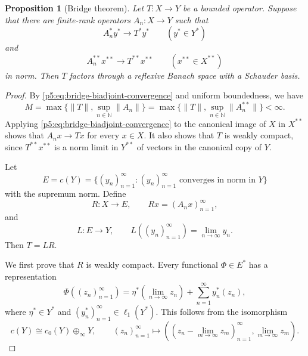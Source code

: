 \documentclass[11pt,reqno]{amsart}
\makeatletter
\theoremstyle{plain}
\newtheorem{proposition}[proposition]{Proposition}
\theoremstyle{definition}
\newcounter{problempaper}
\newenvironment{problempaperbody}{%
  \setcounter{subsection}{0}%
  \setcounter{subsubsection}{0}%
  \setcounter{paragraph}{0}%
  \renewcommand{\thesubsection}{\arabic{subsection}}%
  \renewcommand{\thesubsubsection}{\thesubsection.\arabic{subsubsection}}%
  \renewcommand{\theparagraph}{\thesubsubsection.\arabic{paragraph}}%
  \let\problem@outersection\section
  \let\problem@outersubsection\subsection
  \let\problem@outersubsubsection\subsubsection
  \let\problem@outerparagraph\paragraph
  \let\section\problem@papersection
  \let\subsection\problem@papersubsection
  \let\subsubsection\problem@papersubsubsection
}{%
  \let\section\problem@outersection
  \let\subsection\problem@outersubsection
  \let\subsubsection\problem@outersubsubsection
  \let\paragraph\problem@outerparagraph
}
\newcommand{\problem@target}[2]{%
  \hypertarget{problem-\theproblempaper-#1-#2}{}%
}
\newcommand{\problem@paperheading}[3]{%
  \par\bigskip
  \problem@target{#1}{#2}%
  \noindent{\large\bfseries #2.\quad #3\par}%
  \nobreak\smallskip
}
\newcommand{\problem@papersubheading}[3]{%
  \par\medskip
  \problem@target{#1}{#2}%
  \noindent{\normalsize\bfseries #2.\quad #3\par}%
  \nobreak\smallskip
}
\newcommand{\problem@papersubsubheading}[3]{%
  \par\smallskip
  \problem@target{#1}{#2}%
  \noindent{\normalsize\itshape #2.\quad #3.\ }%
}
\def\problem@papersection{%
  \@ifstar{\problem@papersectionstar}{\problem@papersectionnostar}%
}
\def\problem@papersectionstar#1{%
  \par\bigskip\noindent{\large\bfseries #1\par}\nobreak\smallskip
}
\def\problem@papersectionnostar#1{%
  \refstepcounter{subsection}%
  \setcounter{subsubsection}{0}%
  \setcounter{paragraph}{0}%
  \problem@paperheading{section}{\thesubsection}{#1}%
  \problem@writecontentsline{section}{\thesubsection}{#1}%
}
\def\problem@papersubsection{%
  \@ifstar{\problem@papersubsectionstar}{\problem@papersubsectionnostar}%
}
\def\problem@papersubsectionstar#1{%
  \par\medskip\noindent{\normalsize\bfseries #1\par}\nobreak\smallskip
}
\def\problem@papersubsectionnostar#1{%
  \refstepcounter{subsubsection}%
  \setcounter{paragraph}{0}%
  \problem@papersubheading{subsection}{\thesubsubsection}{#1}%
  \problem@writecontentsline{subsection}{\thesubsubsection}{#1}%
}
\def\problem@papersubsubsection{%
  \@ifstar{\problem@papersubsubsectionstar}{\problem@papersubsubsectionnostar}%
}
\def\problem@papersubsubsectionstar#1{%
  \par\smallskip\noindent{\normalsize\itshape #1.\ }%
}
\def\problem@papersubsubsectionnostar#1{%
  \refstepcounter{paragraph}%
  \problem@papersubsubheading{subsubsection}{\theparagraph}{#1}%
  \problem@writecontentsline{subsubsection}{\theparagraph}{#1}%
}
\newcommand{\problem@writecontentsline}[3]{%
  \begingroup
  \protected@write\@auxout{}{%
    \string\problemcontentsentry{\theproblempaper}{#1}{#2}{#3}{\thepage}%
  }%
  \endgroup
}
\newcommand{\problemcontentsentry}[5]{%
  \@ifundefined{problemcontents@#1}{%
    \expandafter\gdef\csname problemcontents@#1\endcsname{}%
  }{}%
  \expandafter\g@addto@macro\csname problemcontents@#1\endcsname{%
    \problemcontentsline{#1}{#2}{#3}{#4}{#5}%
  }%
}
\newcommand{\problemcontentslink}[4]{%
  \hyperlink{problem-#1-#2-#3}{#4}%
}
\newcommand{\problemcontentsline}[5]{%
  \ifstrequal{#2}{section}{%
    \par\noindent
    \problemcontentslink{#1}{#2}{#3}{\makebox[2.5em][l]{#3}#4}%
    \nobreak\dotfill
    \problemcontentslink{#1}{#2}{#3}{#5}\par
  }{%
    \ifstrequal{#2}{subsection}{%
      \par\noindent\hspace*{1.5em}%
      \problemcontentslink{#1}{#2}{#3}{\makebox[3.5em][l]{#3}#4}%
      \nobreak\dotfill
      \problemcontentslink{#1}{#2}{#3}{#5}\par
    }{%
      \par\noindent\hspace*{3em}%
      \problemcontentslink{#1}{#2}{#3}{\makebox[4.5em][l]{#3}#4}%
      \nobreak\dotfill
      \problemcontentslink{#1}{#2}{#3}{#5}\par
    }%
  }%
}
\makeatother
\begin{document}
\begin{problempaperbody}
\begin{proposition}[Bridge theorem]
\label{p5:prop:bridge}
Let $T\colon X\to Y$ be a bounded operator. Suppose that there are finite-rank operators $A_n\colon X\to Y$ such that
\begin{equation}
\label{p5:eq:bridge-adjoint-convergence}
        A_n^*y^*\to T^*y^* \qquad (y^*\in Y^*)
\end{equation}
and
\begin{equation}
\label{p5:eq:bridge-biadjoint-convergence}
        A_n^{**}x^{**}\to T^{**}x^{**} \qquad (x^{**}\in X^{**})
\end{equation}
in norm. Then $T$ factors through a reflexive Banach space with a Schauder basis.
\end{proposition}

\begin{proof}
By \eqref{p5:eq:bridge-biadjoint-convergence} and uniform boundedness, we have
\begin{equation*}
        M=\max\{\|T\|,\sup_{n\in\mathbb N}\|A_n\|\}
        =\max\{\|T\|,\sup_{n\in\mathbb N}\|A_n^{**}\|\}<\infty .
\end{equation*}
Applying \eqref{p5:eq:bridge-biadjoint-convergence} to the canonical image of $X$ in $X^{**}$ shows that $A_nx\to Tx$ for every $x\in X$. It also shows that $T$ is weakly compact, since $T^{**}x^{**}$ is a norm limit in $Y^{**}$ of vectors in the canonical copy of $Y$.

Let
\begin{equation*}
        E=c(Y)=\{(y_n)_{n=1}^{\infty}\colon (y_n)_{n=1}^{\infty}\text{ converges in norm in }Y\}
\end{equation*}
with the supremum norm. Define
\begin{equation*}
        R\colon X\to E,\qquad Rx=(A_nx)_{n=1}^{\infty},
\end{equation*}
and
\begin{equation*}
        L\colon E\to Y,\qquad L((y_n)_{n=1}^{\infty})=\lim_{n\to\infty}y_n .
\end{equation*}
Then $T=LR$.

We first prove that $R$ is weakly compact. Every functional $\Phi\in E^*$ has a representation
\begin{equation*}
        \Phi((z_n)_{n=1}^{\infty})=\eta^*\left(\lim_{n\to\infty} z_n\right)+\sum_{n=1}^{\infty} y_n^*(z_n),
\end{equation*}
where $\eta^*\in Y^*$ and $(y_n^*)_{n=1}^{\infty}\in\ell_1(Y^*)$. This follows from the isomorphism
\begin{equation*}
        c(Y)\cong c_0(Y)\oplus_{\infty}Y,\qquad (z_n)_{n=1}^{\infty}\mapsto \left((z_n-\lim_{m\to\infty} z_m)_{n=1}^{\infty},\lim_{m\to\infty} z_m\right).
\end{equation*}


\end{proof}
\end{problempaperbody}
\end{document}
